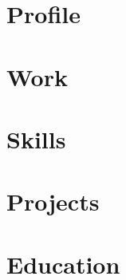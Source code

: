 \documentclass[12pt]{article}
\begin{document}
\section*{Profile}
\section*{Work}
\section*{Skills}
\section*{Projects}
\section*{Education}
\end{document}
